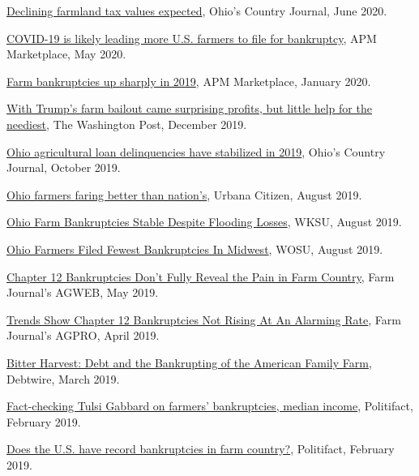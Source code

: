 \documentclass[letterpaper]{article}
\renewenvironment{itemize}{
  \begin{list}{}{
    \setlength{\leftmargin}{1.5em}
  }
}{
  \end{list}
}
\begin{document}
\begin{itemize}
\item \href{https://www.ocj.com/2020/06/declining-farmland-tax-values-expected/}{Declining farmland tax values expected}, Ohio's Country Journal, June 2020.
\item \href{https://www.marketplace.org/2020/05/20/covid19-leading-more-farm-bankruptcies/}{COVID-19 is likely leading more U.S. farmers to file for bankruptcy}, APM Marketplace, May 2020.
\item \href{https://www.marketplace.org/2020/01/31/farm-bankruptcies-up-sharply-in-2019/}{Farm bankruptcies up sharply in 2019}, APM Marketplace, January 2020.

\item \href{https://www.washingtonpost.com/business/2019/12/21/after-miserable-farm-sector-still-came-out-ahead-thanks-government-assistance/?arc404=true}{With Trump's farm bailout came surprising profits, but little help for the neediest}, The Washington Post, December 2019.
\item \href{https://www.ocj.com/2019/10/ohio-agricultural-loan-delinquencies-have-stabilized-in-2019/}{Ohio agricultural loan delinquencies have stabilized in 2019}, Ohio's Country Journal, October 2019.
\item \href{https://www.urbanacitizen.com/news/71744/ohio-farmers-faring-better-than-nations}{Ohio farmers faring better than nation's}, Urbana Citizen, August 2019.
\item \href{https://www.wksu.org/post/ohio-farm-bankruptcies-stable-despite-flooding-losses#stream/0}{Ohio Farm Bankruptcies Stable Despite Flooding Losses}, WKSU, August 2019.
\item \href{https://radio.wosu.org/post/ohio-farmers-filed-fewest-bankruptcies-midwest#stream/0}{Ohio Farmers Filed Fewest Bankruptcies In Midwest}, WOSU, August 2019.
\item \href{https://www.agweb.com/article/chapter-12-bankruptcies-dont-fully-reveal-the-pain-in-farm-country/}{Chapter 12 Bankruptcies Don't Fully Reveal the Pain in Farm Country}, Farm Journal's AGWEB, May 2019.
\item \href{https://www.agprofessional.com/article/trends-show-chapter-12-bankruptcies-not-rising-alarming-rate}{Trends Show Chapter 12 Bankruptcies Not Rising At An Alarming Rate}, Farm Journal's AGPRO, April 2019.
\item \href{http://investigations.debtwire.com/bitter-harvest-debt-and-the-bankrupting-of-the-american-family-farm/}{Bitter Harvest: Debt and the Bankrupting of the American Family Farm}, Debtwire, March 2019.
\item \href{https://www.politifact.com/truth-o-meter/statements/2019/feb/27/tulsi-gabbard/tulsi-gabbard/}{Fact-checking Tulsi Gabbard on farmers' bankruptcies, median income}, Politifact, February 2019.
\item \href{https://www.politifact.com/punditfact/statements/2019/feb/26/heidi-heitkamp/does-us-have-record-bankruptcies-farm-country/}{Does the U.S. have record bankruptcies in farm country?}, Politifact, February 2019.


\end{itemize}
\end{document}
